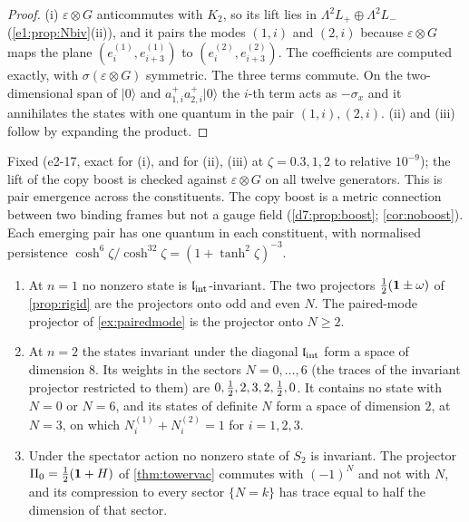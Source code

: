 \begin{proof}
(i) $\varepsilon\otimes G$ anticommutes with $K_2$, so its lift lies in $\Lambda^2L_+\oplus\Lambda^2L_-$ (\cref{e1:prop:Nbiv}(ii)), and it pairs the modes
$(1,i)$ and $(2,i)$ because $\varepsilon\otimes G$ maps the plane $(e^{(1)}_i,e^{(1)}_{i+3})$ to $(e^{(2)}_i,e^{(2)}_{i+3})$. The coefficients are
computed exactly, with $\sigma(\varepsilon\otimes G)$ symmetric. The three terms commute. On the two-dimensional span of $|0\rangle$ and
$a^+_{1,i}a^+_{2,i}|0\rangle$ the $i$-th term acts as $-\sigma_x$ and it annihilates the states with one quantum in the pair $(1,i),(2,i)$. (ii)
and (iii) follow by expanding the product.
\end{proof}

Fixed (e2-17, exact for (i), and for (ii), (iii) at $\zeta=0.3,1,2$ to relative $10^{-9}$); the lift of the copy boost is checked against
$\varepsilon\otimes G$ on all twelve generators. This is pair emergence across the constituents. The copy boost is a metric connection
between two binding frames but not a gauge field (\cref{d7:prop:boost}; \cref{cor:noboost}). Each emerging pair has
one quantum in each constituent, with normalised persistence $\cosh^6\zeta/\cosh^32\zeta=(1+\tanh^2\zeta)^{-3}$.

\begin{proposition}
\label{e2:prop:invstates}
\begin{enumerate}[label=(\roman*),leftmargin=2.2em]
\item At $n=1$ no nonzero state is $\mathfrak l_{\rm int}$-invariant. The two projectors $\tfrac12(\mathbf 1\pm\omega)$ of \cref{prop:rigid} are the projectors
onto odd and even $N$. The paired-mode projector of \cref{ex:pairedmode} is the projector onto $N\ge2$.
\item At $n=2$ the states invariant under the diagonal $\mathfrak l_{\rm int}$ form a space of dimension $8$. Its weights in the sectors $N=0,\dots,6$ (the
traces of the invariant projector restricted to them) are $0,\tfrac12,2,3,2,\tfrac12,0$. It contains no state with $N=0$ or $N=6$, and its states of
definite $N$ form a space of dimension $2$, at $N=3$, on which $N^{(1)}_i+N^{(2)}_i=1$ for $i=1,2,3$.
\item Under the spectator action no nonzero state of $S_2$ is invariant. The projector $\Pi_0=\tfrac12(\mathbf 1+H)$ of \cref{thm:towervac}
commutes with $(-1)^N$ and not with $N$, and its compression to every sector $\{N=k\}$ has trace equal to half the dimension of that sector.
\end{enumerate}
\end{proposition}

